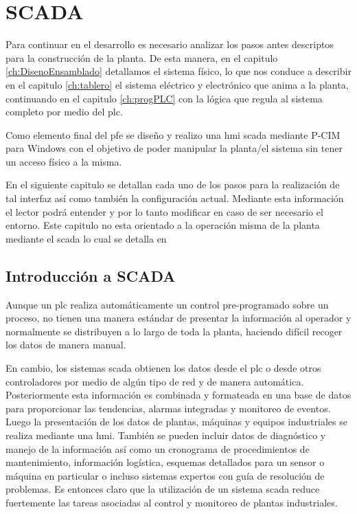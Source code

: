 \chapter{SCADA}
\label{ch:scada}

Para continuar en el desarrollo es necesario analizar los pasos antes descriptos para la construcción
de la planta. De esta manera, en el capitulo \ref{ch:DisenoEnsamblado} detallamos el sistema 
físico, lo que nos conduce a describir en el capitulo \ref{ch:tablero} el sistema eléctrico y
electrónico que anima a la planta, continuando en el capitulo \ref{ch:progPLC} con la lógica
que regula al sistema completo por medio del \gls{plc}. 

Como elemento final del \gls{pfe} se diseño y realizo una \gls{hmi} \gls{scada}
mediante P-CIM para Windows con el objetivo de poder manipular la planta/el sistema
sin tener un acceso físico a la misma.

En el siguiente capitulo se detallan cada uno de los pasos para la realización de tal interfaz
así como también la configuración actual. Mediante esta información el lector podrá entender
y por lo tanto modificar en caso de ser necesario el entorno. Este capitulo no esta 
orientado a la operación misma de la planta mediante el \gls{scada} lo cual se detalla en 

\section{Introducción a SCADA}
\label{sec:IntroScada}

Aunque un \gls{plc} realiza automáticamente un control pre-programado sobre un proceso, 
no tienen una manera estándar de presentar la información al operador y normalmente se 
distribuyen a lo largo de toda la planta, haciendo difícil recoger los datos de manera 
manual.%

En cambio, los sistemas \gls{scada} obtienen los datos desde el \gls{plc} o desde otros controladores 
por medio de algún tipo de red y de manera automática. Posteriormente esta información 
es combinada y formateada en una base de datos para proporcionar las tendencias, alarmas 
integradas y monitoreo de eventos. Luego la presentación de los datos de plantas, máquinas y 
equipos industriales se realiza mediante una \gls{hmi}. También se pueden 
incluir datos de diagnóstico y manejo de la información así como un cronograma de 
procedimientos de mantenimiento, información logística, esquemas detallados para un sensor 
o máquina en particular o incluso sistemas expertos con guía de resolución de problemas. Es entonces
claro que la utilización de un sistema \gls{scada} reduce fuertemente las tareas asociadas al control
y monitoreo de plantas industriales.

